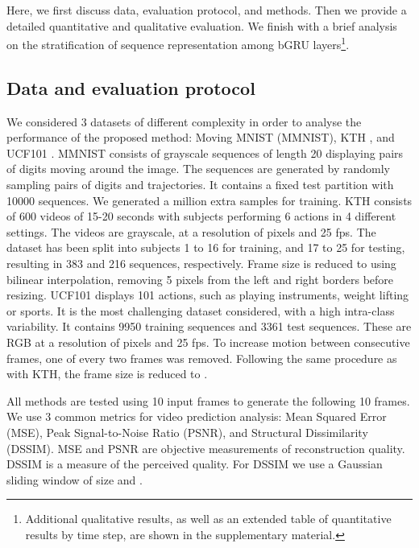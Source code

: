 \documentclass[runningheads]{llncs}
\begin{document}
Here, we first discuss data, evaluation protocol, and methods. Then we provide a detailed quantitative and qualitative evaluation. We finish with a brief analysis on the stratification of sequence representation among bGRU layers\footnote{Additional qualitative results, as well as an extended table of quantitative results by time step, are shown in the supplementary material.}.



\subsection{Data and evaluation protocol}
\label{sec:experiments:methodology}

We considered 3 datasets of different complexity in order to analyse the performance of the proposed method: Moving MNIST (MMNIST)\cite{srivastava2015unsupervised}, KTH \cite{kth}, and UCF101 \cite{ucf101}. MMNIST consists of  grayscale sequences of length 20 displaying pairs of digits moving around the image. The sequences are generated by randomly sampling pairs of digits and trajectories. It contains a fixed test partition with 10000 sequences. We generated a million extra samples for training. KTH consists of 600 videos of 15-20 seconds with  subjects performing 6 actions in 4 different settings. The videos are grayscale, at a resolution of  pixels and 25 fps. The dataset has been split into subjects 1 to 16 for training, and 17 to 25 for testing, resulting in 383 and 216 sequences, respectively. Frame size is reduced to  using bilinear interpolation, removing 5 pixels from the left and right borders before resizing. UCF101 displays 101 actions, such as playing instruments, weight lifting or sports. It is the most challenging dataset considered, with a high intra-class variability. It contains 9950 training sequences and 3361 test sequences. These are RGB at a resolution of  pixels and 25 fps. To increase motion between consecutive frames, one of every two frames was removed. Following the same procedure as with KTH, the frame size is reduced to .

All methods are tested using 10 input frames to generate the following 10 frames. We use 3 common metrics for video prediction analysis: Mean Squared Error (MSE), Peak Signal-to-Noise Ratio (PSNR), and Structural Dissimilarity (DSSIM). MSE and PSNR are objective measurements of reconstruction quality. DSSIM is a measure of the perceived quality. For DSSIM we use a Gaussian sliding window of size  and .
\end{document}
